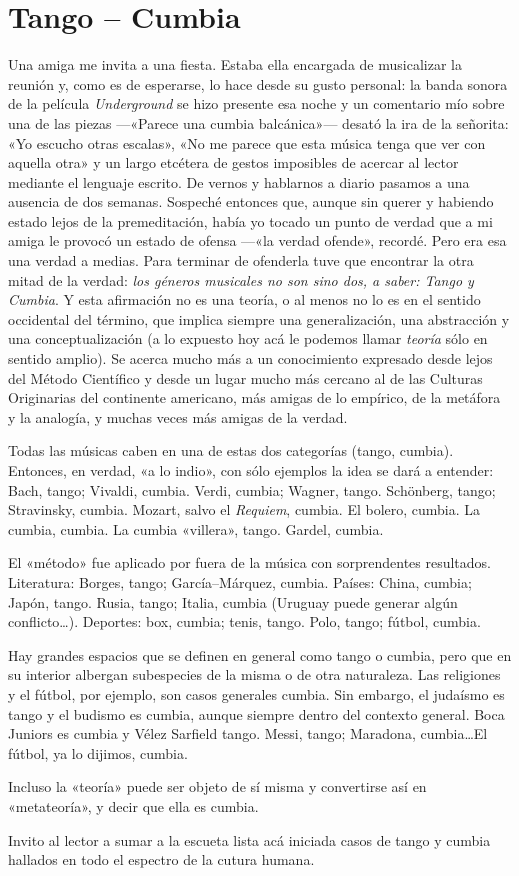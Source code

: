 \chapter {Tango -- Cumbia}
Una amiga me invita a una fiesta. Estaba ella encargada de musicalizar la reunión y, como es de esperarse, lo hace desde su gusto personal: la banda sonora de la película \emph{Underground} se hizo presente esa noche y un comentario mío sobre una de las piezas ---«Parece una cumbia balcánica»--- desató la ira de la señorita: «Yo escucho otras escalas», «No me parece que esta música tenga que ver con
aquella otra» y un largo etcétera de gestos imposibles de acercar al lector mediante el lenguaje escrito. De vernos y hablarnos a diario pasamos a una ausencia de dos semanas. Sospeché entonces que, aunque sin querer y habiendo estado lejos de la premeditación, había yo tocado un punto de verdad que a mi amiga le provocó un estado de ofensa ---«la verdad ofende», recordé. Pero era esa una verdad a medias. Para terminar de ofenderla tuve que encontrar la otra mitad de la verdad: \emph{los géneros musicales no son sino dos, a saber: Tango y Cumbia}. Y esta afirmación no es una teoría, o al menos no lo es en el sentido occidental del término, que implica siempre una generalización, una abstracción y una conceptualización (a lo expuesto hoy acá le podemos llamar \emph{teoría} sólo en sentido amplio). Se acerca mucho más a un conocimiento expresado desde lejos del Método Científico y desde un lugar mucho más cercano al de las Culturas Originarias del continente americano, más amigas de lo empírico, de la metáfora y la analogía, y muchas veces más amigas de la verdad.

Todas las músicas caben en una de estas dos categorías (tango, cumbia). Entonces, en verdad, «a lo indio», con sólo ejemplos la idea se dará a entender: Bach, tango; Vivaldi, cumbia. Verdi, cumbia; Wagner, tango. Schönberg, tango; Stravinsky, cumbia. Mozart, salvo el \emph{Requiem}, cumbia. El bolero, cumbia. La cumbia, cumbia. La cumbia «villera», tango. Gardel, cumbia.

El «método» fue aplicado por fuera de la música con sorprendentes resultados. Literatura: Borges, tango; García--Márquez, cumbia. Países: China, cumbia; Japón, tango. Rusia, tango; Italia, cumbia (Uruguay puede generar algún conflicto\ldots{}). Deportes: box, cumbia; tenis, tango. Polo, tango; fútbol, cumbia.

Hay grandes espacios que se definen en general como tango o cumbia, pero que en su interior albergan subespecies de la misma o de otra naturaleza. Las religiones y el fútbol, por ejemplo, son casos generales cumbia. Sin embargo, el judaísmo es tango y el budismo es cumbia, aunque siempre dentro del contexto general. Boca Juniors es cumbia y Vélez Sarfield tango.  Messi, tango; Maradona, cumbia\ldots{}El fútbol, ya lo dijimos, cumbia.

Incluso la «teoría» puede ser objeto de sí misma y convertirse así en «metateoría», y decir que ella es cumbia.

Invito al lector a sumar a la escueta lista acá iniciada casos de tango y cumbia hallados en todo el espectro de la cutura humana.